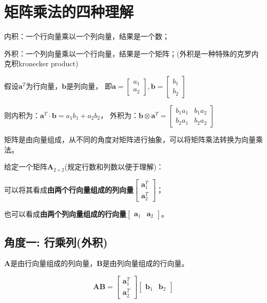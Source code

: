 \section{矩阵乘法的四种理解}
内积：一个行向量乘以一个列向量，结果是一个数；

外积：一个列向量乘以一个行向量，结果是一个矩阵；(外积是一种特殊的克罗内克积kronecker product)

假设$\bm{a}^T$为行向量，$\bm{b}$是列向量， 即$\bm{a} = \left[\begin{array}{c}a_{1} \\ a_{2}\end{array}\right], \bm{b} = \left[\begin{array}{c}b_{1} \\ b_{2}\end{array}\right]$

则内积为：$\bm{a}^{T} \cdot \bm{b}=a_{1} b_{1}+a_{2} b_{2}$， 外积为：$\bm{b} \otimes \bm{a}^{T}=\left[\begin{array}{ll}b_{1} a_{1} & b_{1} a_{2} \\ b_{2} a_{1} & b_{2} a_{2}\end{array}\right]$

矩阵是由向量组成，从不同的角度对矩阵进行抽象，可以将矩阵乘法转换为向量乘法。

给定一个矩阵$\bm{A}_{2 \times 2}$(规定行数和列数以便于理解)：

可以将其看成\textbf{由两个行向量组成的列向量}$\left[\begin{array}{c}\bm{a}_{1}^{T} \\ \bm{a}_{2}^{T}\end{array}\right]$；

也可以看成\textbf{由两个列向量组成的行向量}$\left[\begin{array}{ll}\bm{a}_{1} & \bm{a}_{2}\end{array}\right]$。

\subsection{角度一: 行乘列(外积)}
$\bm{A}$是由行向量组成的列向量，$\bm{B}$是由列向量组成的行向量。

$$\bm{A} \bm{B}=\left[\begin{array}{c}\bm{a}_{1}^{T} \\ \bm{a}_{2}^{T}\end{array}\right]\left[\begin{array}{ll}\bm{b}_{1} & \bm{b}_{2}\end{array}\right]$$


